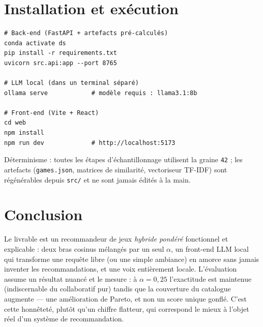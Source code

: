 \documentclass[11pt,a4paper]{article}
\begin{document}
\section{Installation et exécution}

\begin{verbatim}
# Back-end (FastAPI + artefacts pré-calculés)
conda activate ds
pip install -r requirements.txt
uvicorn src.api:app --port 8765

# LLM local (dans un terminal séparé)
ollama serve            # modèle requis : llama3.1:8b

# Front-end (Vite + React)
cd web
npm install
npm run dev             # http://localhost:5173
\end{verbatim}

\noindent Déterminisme : toutes les étapes d'échantillonnage utilisent la graine
\texttt{42} ; les artefacts (\texttt{games.json}, matrices de similarité,
vectoriseur TF-IDF) sont régénérables depuis \texttt{src/} et ne sont jamais
édités à la main.

\section*{Conclusion}

Le livrable est un recommandeur de jeux \emph{hybride pondéré} fonctionnel et
explicable : deux bras cosinus mélangés par un seul $\alpha$, un front-end LLM
local qui transforme une requête libre (ou une simple ambiance) en amorce sans
jamais inventer les recommandations, et une voix entièrement locale. L'évaluation
assume un résultat nuancé et le mesure : à $\alpha=0{,}25$ l'exactitude est
maintenue (indiscernable du collaboratif pur) tandis que la couverture du
catalogue augmente — une amélioration de Pareto, et non un score unique gonflé.
C'est cette honnêteté, plutôt qu'un chiffre flatteur, qui correspond le mieux à
l'objet réel d'un système de recommandation.
\end{document}
